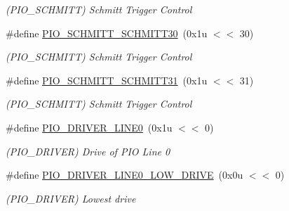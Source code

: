 \begin{DoxyCompactItemize}
\begin{DoxyCompactList}\small\item\em (P\+I\+O\+\_\+\+S\+C\+H\+M\+I\+TT) Schmitt Trigger Control \end{DoxyCompactList}\item 
\mbox{\label{group__SAMS70__PIO_gaf2bb44849b6f31453b677ff9b6cc8378}} 
\#define \mbox{\hyperlink{group__SAMS70__PIO_gaf2bb44849b6f31453b677ff9b6cc8378}{P\+I\+O\+\_\+\+S\+C\+H\+M\+I\+T\+T\+\_\+\+S\+C\+H\+M\+I\+T\+T30}}~(0x1u $<$$<$ 30)
\begin{DoxyCompactList}\small\item\em (P\+I\+O\+\_\+\+S\+C\+H\+M\+I\+TT) Schmitt Trigger Control \end{DoxyCompactList}\item 
\mbox{\label{group__SAMS70__PIO_ga6e090e0abaa4744c63b94001aa7f59af}} 
\#define \mbox{\hyperlink{group__SAMS70__PIO_ga6e090e0abaa4744c63b94001aa7f59af}{P\+I\+O\+\_\+\+S\+C\+H\+M\+I\+T\+T\+\_\+\+S\+C\+H\+M\+I\+T\+T31}}~(0x1u $<$$<$ 31)
\begin{DoxyCompactList}\small\item\em (P\+I\+O\+\_\+\+S\+C\+H\+M\+I\+TT) Schmitt Trigger Control \end{DoxyCompactList}\item 
\mbox{\label{group__SAMS70__PIO_ga0bb8a6cb8869606acd6f1dd8b13babb2}} 
\#define \mbox{\hyperlink{group__SAMS70__PIO_ga0bb8a6cb8869606acd6f1dd8b13babb2}{P\+I\+O\+\_\+\+D\+R\+I\+V\+E\+R\+\_\+\+L\+I\+N\+E0}}~(0x1u $<$$<$ 0)
\begin{DoxyCompactList}\small\item\em (P\+I\+O\+\_\+\+D\+R\+I\+V\+ER) Drive of P\+IO Line 0 \end{DoxyCompactList}\item 
\mbox{\label{group__SAMS70__PIO_ga7078cbfb7bd12e566ccfa09fb89bec49}} 
\#define \mbox{\hyperlink{group__SAMS70__PIO_ga7078cbfb7bd12e566ccfa09fb89bec49}{P\+I\+O\+\_\+\+D\+R\+I\+V\+E\+R\+\_\+\+L\+I\+N\+E0\+\_\+\+L\+O\+W\+\_\+\+D\+R\+I\+VE}}~(0x0u $<$$<$ 0)
\begin{DoxyCompactList}\small\item\em (P\+I\+O\+\_\+\+D\+R\+I\+V\+ER) Lowest drive \end{DoxyCompactList}\item 

\end{DoxyCompactItemize}
